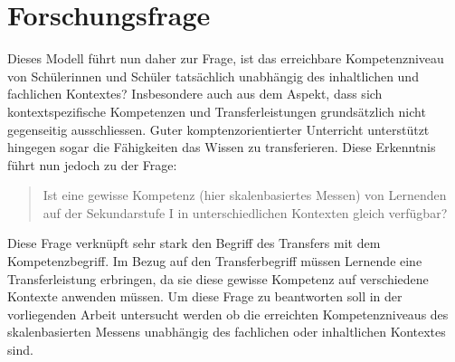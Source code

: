 \section{Forschungsfrage}

Dieses Modell führt nun daher zur Frage, ist das erreichbare Kompetenzniveau von Schüler\-innen und Schüler tatsächlich unabhängig des inhaltlichen und fachlichen Kontextes? Insbesondere auch aus dem Aspekt, dass sich kontextspezifische Kompetenzen und Transferleistungen grundsätzlich nicht gegenseitig ausschliessen. Guter komptenzorientierter Unterricht unterstützt hingegen sogar die Fähigkeiten das Wissen zu transferieren. Diese Erkenntnis führt nun jedoch zu der Frage: 
\begin{quote}
Ist eine gewisse Kompetenz (hier skalenbasiertes Messen) von Lernenden auf der Sekundarstufe I in unterschiedlichen Kontexten gleich verfügbar?
\end{quote}

Diese Frage verknüpft sehr stark den Begriff des Transfers mit dem Kompetenzbegriff. Im
Bezug auf den Transferbegriff müssen Lernende eine Transferleistung erbringen, da sie
diese gewisse Kompetenz auf verschiedene Kontexte anwenden müssen. Um diese Frage zu beantworten soll in der vorliegenden Arbeit untersucht werden ob die erreichten Kompetenzniveaus des skalenbasierten Messens unabhängig des fachlichen oder inhaltlichen Kontextes sind.



